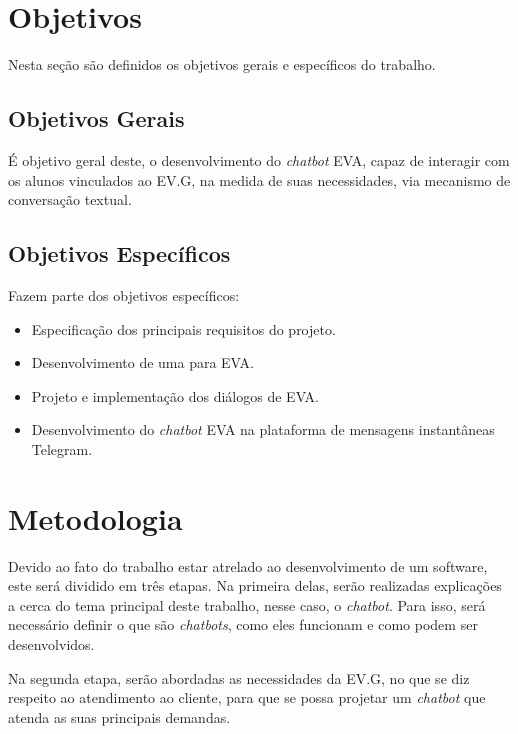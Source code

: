 \section{Objetivos}\label{cap:01:sec:01:objetivos}

Nesta seção são definidos os objetivos gerais e específicos do trabalho.


\subsection{Objetivos Gerais}\label{cap:01:sec:01:sub:01:objetivo-geral}

É objetivo geral deste, o desenvolvimento do \textit{chatbot} EVA, capaz de interagir com os alunos vinculados ao EV.G, na medida de suas necessidades, via mecanismo de conversação textual.


\subsection{Objetivos Específicos}\label{cap:01:sec:01:sub:02:ojetivos-especificos}

Fazem parte dos objetivos específicos:

\begin{itemize}
    \item Especificação dos principais requisitos do projeto.
    \item Desenvolvimento de uma  para EVA.
    \item Projeto e implementação dos diálogos de EVA.
    \item Desenvolvimento do \textit{chatbot} EVA na plataforma de mensagens instantâneas Telegram.
\end{itemize}


\section{Metodologia}\label{cap:01:sec:02:metodologia}

Devido ao fato do trabalho estar atrelado ao desenvolvimento de um software, este será dividido em três etapas. 
Na primeira delas, serão realizadas explicações a cerca do tema principal deste trabalho, nesse caso, o \textit{chatbot}. Para isso, será necessário definir o que são \textit{chatbots}, como eles funcionam e como podem ser desenvolvidos.

Na segunda etapa, serão abordadas as necessidades da EV.G, no que se diz respeito ao atendimento ao cliente, para que se possa projetar um \textit{chatbot} que atenda as suas principais demandas.


